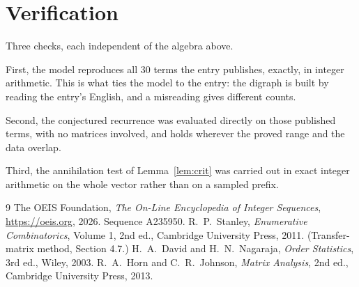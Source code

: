 \documentclass[11pt,a4paper]{article}
\theoremstyle{plain}
\theoremstyle{definition}
\begin{document}
\section{Verification}

Three checks, each independent of the algebra above.

First, the model reproduces all $30$ terms the entry publishes, exactly, in integer
arithmetic. This is what ties the model to the entry: the digraph is built by reading the
entry's English, and a misreading gives different counts.

Second, the conjectured recurrence was evaluated directly on those published terms, with no
matrices involved, and holds wherever the proved range and the data overlap.

Third, the annihilation test of Lemma~\ref{lem:crit} was carried out in exact integer
arithmetic on the whole vector rather than on a sampled prefix.

\begin{thebibliography}{9}
 The OEIS Foundation, \emph{The On-Line Encyclopedia of Integer
Sequences}, \url{https://oeis.org}, 2026. Sequence A235950.
 R.~P.~Stanley, \emph{Enumerative Combinatorics}, Volume 1, 2nd ed.,
Cambridge University Press, 2011. (Transfer-matrix method, Section 4.7.)
 H.~A.~David and H.~N.~Nagaraja, \emph{Order Statistics}, 3rd ed., Wiley,
2003.
 R.~A.~Horn and C.~R.~Johnson, \emph{Matrix Analysis}, 2nd ed., Cambridge
University Press, 2013.
\end{thebibliography}
\end{document}
